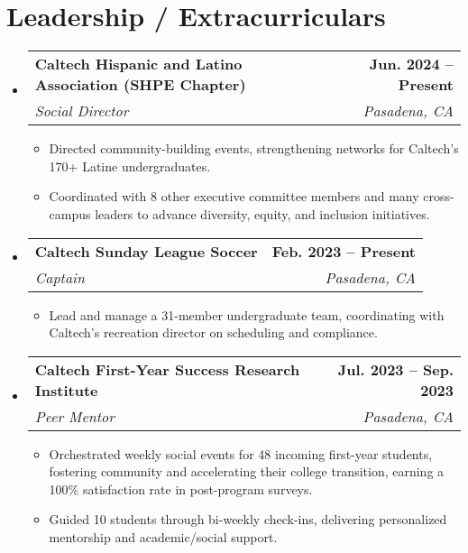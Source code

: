 \documentclass[letterpaper,11pt]{article}
\makeatletter
\newcommand{\resumeItem}[1]{
  \item\normalsize{
    {#1 \vspace{-2pt}}
  }
}
\newcommand{\resumeSubheading}[4]{
  \vspace{-2pt}\item
    \begin{tabular*}{1.0\textwidth}[t]{l@{\extracolsep{\fill}}r}
      \textbf{#1} & \textbf{\small #2} \\
      \textit{\small#3} & \textit{\small #4} \\
    \end{tabular*}\vspace{-7pt}
}
\newcommand{\resumeSubHeadingListStart}{\begin{itemize}[leftmargin=0.0in, label={}]}
\newcommand{\resumeSubHeadingListEnd}{\end{itemize}}
\newcommand{\resumeItemListStart}{\begin{itemize}}
\newcommand{\resumeItemListEnd}{\end{itemize}\vspace{-5pt}}
\makeatother
\begin{document}
\section{Leadership / Extracurriculars}
    \resumeSubHeadingListStart
        \resumeSubheading{Caltech Hispanic and Latino Association (SHPE Chapter)}{Jun. 2024 -- Present}{Social Director}{Pasadena, CA}
        \resumeItemListStart
          \resumeItem{Directed community-building events, strengthening networks for Caltech’s 170+ Latine undergraduates.}
          \resumeItem{Coordinated with 8 other executive committee members and many cross-campus leaders to advance diversity, equity, and inclusion initiatives.}
        \resumeItemListEnd
        \resumeSubheading{Caltech Sunday League Soccer}{Feb. 2023 -- Present}{Captain}{Pasadena, CA}
        \resumeItemListStart
          \resumeItem{Lead and manage a 31-member undergraduate team, coordinating with Caltech's recreation director on scheduling and compliance.}
        \resumeItemListEnd
        \resumeSubheading{Caltech First-Year Success Research Institute}{Jul. 2023 -- Sep. 2023}{Peer Mentor}{Pasadena, CA}
        \resumeItemListStart
            \resumeItem{Orchestrated weekly social events for 48 incoming first-year students, fostering community and accelerating their college transition, earning a 100\% satisfaction rate in post-program surveys.}
            \resumeItem{Guided 10 students through bi-weekly check-ins, delivering personalized mentorship and academic/social support.}
        \resumeItemListEnd
    \resumeSubHeadingListEnd
\end{document}
